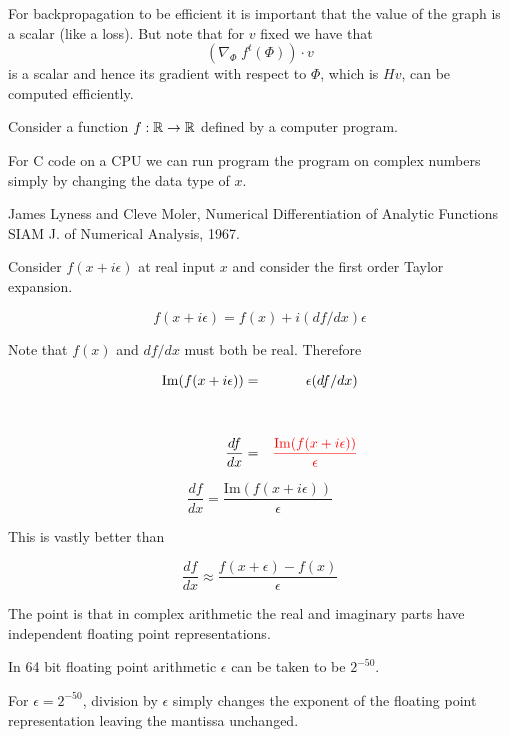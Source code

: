 {
For backpropagation to be efficient it is important that the value of the graph is a scalar (like a loss).  But note that for $v$ fixed we have that
$$(\nabla_\Phi\; f^t(\Phi))\cdot v$$
is a scalar and hence its gradient with respect to $\Phi$, which is $Hv$, can be computed efficiently.

{


Consider a function $f:\mathbb{R} \rightarrow \mathbb{R}$ defined by a computer program.

\vfill
For C code on a CPU we can run program the program on complex numbers simply by changing the data type of $x$.

\vfill
James Lyness and Cleve Moler, Numerical Differentiation of Analytic Functions SIAM J. of Numerical Analysis, 1967.


Consider $f(x + i\epsilon)$ at real input $x$ and consider the first order Taylor expansion.

$$f(x+ i\epsilon) = f(x) + i(df/dx)\epsilon$$

\vfill
Note that $f(x)$ and $df/dx$ must both be real.  Therefore

\vfill
\begin{eqnarray*}
  \mathrm{Im}(f(x + i \epsilon)) & = & \epsilon (df/dx) \\
  \\
  \\
  \frac{df}{dx} & = & {\color{red} \frac{\mathrm{Im}(f(x + i \epsilon))}{\epsilon}}
\end{eqnarray*}



$$\frac{df}{dx}  = \frac{\mathrm{Im}(f(x + i \epsilon))}{\epsilon}$$

\vfill
This is vastly better than

$$\frac{df}{dx} \approx \frac{f(x + \epsilon) - f(x)}{\epsilon}$$

\vfill
The point is that in complex arithmetic the real and imaginary parts have independent floating point representations.

\vfill
In 64 bit floating point arithmetic $\epsilon$ can be taken to be $2^{-50}$.

\vfill
For $\epsilon = 2^{-50}$, division by $\epsilon$ simply changes the exponent of the floating point representation leaving the mantissa unchanged.

}}
